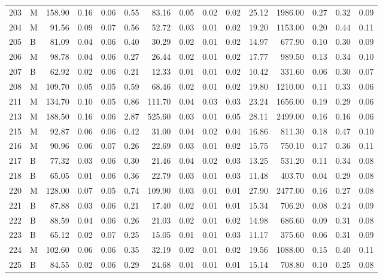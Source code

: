 \begin{table}[ht]
\begin{tabular}{rlrrrrrrrrrrrrr}
  203 & M & 158.90 & 0.16 & 0.06 & 0.55 & 83.16 & 0.05 & 0.02 & 0.02 & 25.12 & 1986.00 & 0.27 & 0.32 & 0.09 \\ 
  204 & M & 91.56 & 0.09 & 0.07 & 0.56 & 52.72 & 0.03 & 0.01 & 0.02 & 19.20 & 1153.00 & 0.20 & 0.44 & 0.11 \\ 
  205 & B & 81.09 & 0.04 & 0.06 & 0.40 & 30.29 & 0.02 & 0.01 & 0.02 & 14.97 & 677.90 & 0.10 & 0.30 & 0.09 \\ 
  206 & M & 98.78 & 0.04 & 0.06 & 0.27 & 26.44 & 0.02 & 0.01 & 0.02 & 17.77 & 989.50 & 0.13 & 0.34 & 0.10 \\ 
  207 & B & 62.92 & 0.02 & 0.06 & 0.21 & 12.33 & 0.01 & 0.01 & 0.02 & 10.42 & 331.60 & 0.06 & 0.30 & 0.07 \\ 
  208 & M & 109.70 & 0.05 & 0.05 & 0.59 & 68.46 & 0.02 & 0.01 & 0.02 & 19.80 & 1210.00 & 0.11 & 0.33 & 0.06 \\ 
  211 & M & 134.70 & 0.10 & 0.05 & 0.86 & 111.70 & 0.04 & 0.03 & 0.03 & 23.24 & 1656.00 & 0.19 & 0.29 & 0.06 \\ 
  213 & M & 188.50 & 0.16 & 0.06 & 2.87 & 525.60 & 0.03 & 0.01 & 0.05 & 28.11 & 2499.00 & 0.16 & 0.16 & 0.06 \\ 
  215 & M & 92.87 & 0.06 & 0.06 & 0.42 & 31.00 & 0.04 & 0.02 & 0.04 & 16.86 & 811.30 & 0.18 & 0.47 & 0.10 \\ 
  216 & M & 90.96 & 0.06 & 0.07 & 0.26 & 22.69 & 0.03 & 0.01 & 0.02 & 15.75 & 750.10 & 0.17 & 0.36 & 0.11 \\ 
  217 & B & 77.32 & 0.03 & 0.06 & 0.30 & 21.46 & 0.04 & 0.02 & 0.03 & 13.25 & 531.20 & 0.11 & 0.34 & 0.08 \\ 
  218 & B & 65.05 & 0.01 & 0.06 & 0.36 & 22.79 & 0.03 & 0.01 & 0.03 & 11.48 & 403.70 & 0.04 & 0.29 & 0.08 \\ 
  220 & M & 128.00 & 0.07 & 0.05 & 0.74 & 109.90 & 0.03 & 0.01 & 0.01 & 27.90 & 2477.00 & 0.16 & 0.27 & 0.08 \\ 
  221 & B & 87.88 & 0.03 & 0.06 & 0.21 & 17.40 & 0.02 & 0.01 & 0.01 & 15.34 & 706.20 & 0.08 & 0.24 & 0.09 \\ 
  222 & B & 88.59 & 0.04 & 0.06 & 0.26 & 21.03 & 0.02 & 0.01 & 0.02 & 14.98 & 686.60 & 0.09 & 0.31 & 0.08 \\ 
  223 & B & 65.12 & 0.02 & 0.07 & 0.25 & 15.05 & 0.01 & 0.01 & 0.03 & 11.17 & 375.60 & 0.06 & 0.31 & 0.09 \\ 
  224 & M & 102.60 & 0.06 & 0.06 & 0.35 & 32.19 & 0.02 & 0.01 & 0.02 & 19.56 & 1088.00 & 0.15 & 0.40 & 0.11 \\ 
  225 & B & 84.55 & 0.02 & 0.06 & 0.29 & 24.68 & 0.01 & 0.01 & 0.01 & 15.14 & 708.80 & 0.10 & 0.25 & 0.08 \\ 

\end{tabular}
\end{table}
